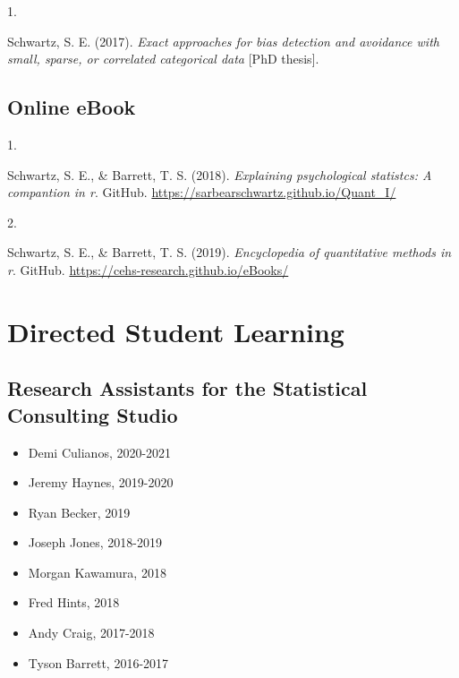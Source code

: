 \documentclass[11pt,a4paper,]{moderncv}
\providecommand{\tightlist}{%
	\setlength{\itemsep}{0pt}\setlength{\parskip}{0pt}}
\newlength{\csllabelwidth}
\newcommand{\CSLLeftMargin}[1]{\parbox[t]{\csllabelwidth}{#1}}
\newcommand{\CSLRightInline}[1]{\parbox[t]{\linewidth - \csllabelwidth}{#1}}
\begin{document}
\hypertarget{refs_student}{}
\leavevmode{}%
\CSLLeftMargin{1. }
\CSLRightInline{Schwartz, S. E. (2017). \emph{Exact approaches for bias
detection and avoidance with small, sparse, or correlated categorical
data} {[}PhD thesis{]}.}

\vspace{7mm}

\hypertarget{online-ebook}{%
\subsection{\texorpdfstring{\textbf{Online
eBook}}{Online eBook}}\label{online-ebook}}

\hypertarget{refs_ebook}{}
\leavevmode{}%
\CSLLeftMargin{1. }
\CSLRightInline{Schwartz, S. E., \& Barrett, T. S. (2018).
\emph{Explaining psychological statistcs: A compantion in r}. GitHub.
\url{https://sarbearschwartz.github.io/Quant_I/}}

\leavevmode{}%
\CSLLeftMargin{2. }
\CSLRightInline{Schwartz, S. E., \& Barrett, T. S. (2019).
\emph{Encyclopedia of quantitative methods in r}. GitHub.
\url{https://cehs-research.github.io/eBooks/}}

\clearpage

\hypertarget{directed-student-learning}{%
\section{Directed Student Learning}\label{directed-student-learning}}

\hypertarget{research-assistants-for-the-statistical-consulting-studio}{%
\subsection{\texorpdfstring{\textbf{Research Assistants for the
Statistical Consulting
Studio}}{Research Assistants for the Statistical Consulting Studio}}\label{research-assistants-for-the-statistical-consulting-studio}}

\begin{itemize}
\tightlist
\item
  Demi Culianos, 2020-2021
\item
  Jeremy Haynes, 2019-2020
\item
  Ryan Becker, 2019
\item
  Joseph Jones, 2018-2019
\item
  Morgan Kawamura, 2018
\item
  Fred Hints, 2018
\item
  Andy Craig, 2017-2018
\item
  Tyson Barrett, 2016-2017
\end{itemize}
\end{document}
